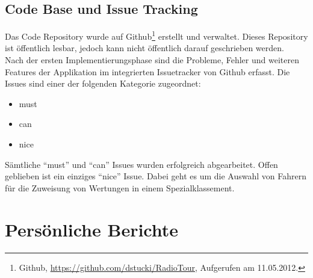 \subsection{Code Base und Issue Tracking}
Das Code Repository wurde auf Github\footnote{Github, \url{https://github.com/dstucki/RadioTour}, Aufgerufen am 11.05.2012.} erstellt und verwaltet. Dieses Repository ist öffentlich lesbar, jedoch kann nicht öffentlich darauf geschrieben werden.
\\
Nach der ersten Implementierungsphase sind die Probleme, Fehler und weiteren Features der Applikation im integrierten Issuetracker von Github erfasst. Die Issues sind einer der folgenden Kategorie zugeordnet:

\begin{itemize}
\item must
\item can
\item nice
\end{itemize}

Sämtliche "`must"' und "`can"' Issues wurden erfolgreich abgearbeitet. Offen geblieben ist ein einziges "`nice"' Issue. Dabei geht es um die Auswahl von Fahrern für die Zuweisung von Wertungen in einem Spezialklassement.




\section{Persönliche Berichte}

